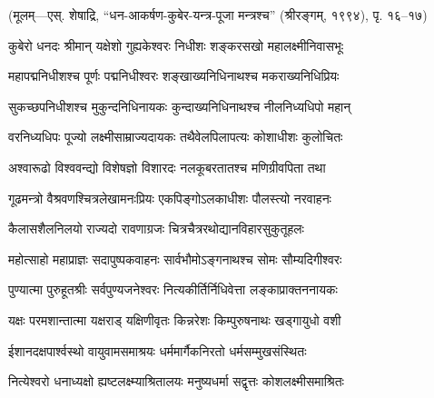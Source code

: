 \centerline{\small{(मूलम्—एस्. शेषाद्रि, ``धन-आकर्षण-कुबेर-यन्त्र-पूजा मन्त्रश्च'' (श्रीरङ्गम्, १९९४), पृ. १६–१७)}}

\twolineshloka
{कुबेरो धनदः श्रीमान् यक्षेशो गुह्यकेश्वरः}
{निधीशः शङ्करसखो महालक्ष्मीनिवासभूः} %

\twolineshloka
{महापद्मनिधीशश्च पूर्णः पद्मनिधीश्वरः}
{शङ्खाख्यनिधिनाथश्च मकराख्यनिधिप्रियः} %

\twolineshloka
{सुकच्छपनिधीशश्च मुकुन्दनिधिनायकः}
{कुन्दाख्यनिधिनाथश्च नीलनिध्यधिपो महान्} %

\twolineshloka
{वरनिध्यधिपः पूज्यो लक्ष्मीसाम्राज्यदायकः}
{तथैवेलपिलापत्यः कोशाधीशः कुलोचितः} %

\twolineshloka
{अश्वारूढो विश्ववन्द्यो विशेषज्ञो विशारदः}
{नलकूबरतातश्च मणिग्रीवपिता तथा} %

\twolineshloka
{गूढमन्त्रो वैश्रवणश्चित्रलेखामनःप्रियः}
{एकपिङ्गोऽलकाधीशः पौलस्त्यो नरवाहनः} %

\twolineshloka
{कैलासशैलनिलयो राज्यदो रावणाग्रजः}
{चित्रचैत्ररथोद्यानविहारसुकुतूहलः} %

\twolineshloka
{महोत्साहो महाप्राज्ञः सदापुष्पकवाहनः}
{सार्वभौमोऽङ्गनाथश्च सोमः सौम्यदिगीश्वरः} %

\twolineshloka
{पुण्यात्मा पुरुहूतश्रीः सर्वपुण्यजनेश्वरः}
{नित्यकीर्तिर्निधिवेत्ता लङ्काप्राक्तननायकः} %

\twolineshloka
{यक्षः परमशान्तात्मा यक्षराड् यक्षिणीवृतः}
{किन्नरेशः किम्पुरुषनाथः खड्गायुधो वशी} %

\twolineshloka
{ईशानदक्षपार्श्वस्थो वायुवामसमाश्रयः}
{धर्ममार्गैकनिरतो धर्मसम्मुखसंस्थितः} %

\twolineshloka
{नित्येश्वरो धनाध्यक्षो ह्यष्टलक्ष्म्याश्रितालयः}
{मनुष्यधर्मा सद्वृत्तः कोशलक्ष्मीसमाश्रितः} %

